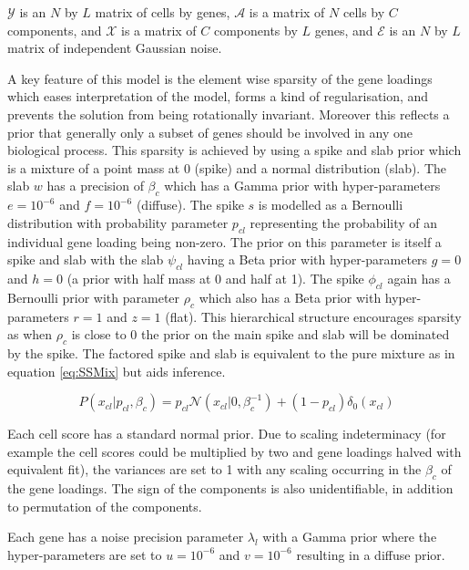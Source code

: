 $\mathcal{Y}$ is an $N$ by $L$ matrix of cells by genes, $\mathcal{A}$ is a matrix of $N$ cells by $C$ components, and $\mathcal{X}$ is a matrix of $C$ components by $L$ genes, and $\mathcal{E}$ is an $N$ by $L$ matrix of independent Gaussian noise.

A key feature of this model is the element wise sparsity of the gene loadings which eases interpretation of the model, forms a kind of regularisation, and prevents the solution from being rotationally invariant. Moreover this reflects a prior that generally only a subset of genes should be involved in any one biological process. This sparsity is achieved by using a spike and slab prior which is a mixture of a point mass at 0 (spike) and a normal distribution (slab). The slab $w$ has a precision of $\beta_{c}$ which has a Gamma prior with hyper-parameters $e = 10^{-6}$ and $f = 10^{-6}$ (diffuse). The spike $s$ is modelled as a Bernoulli distribution with probability parameter $p_{cl}$ representing the probability of an individual gene loading being non-zero. The prior on this parameter is itself a spike and slab with the slab $\psi_{c l}$ having a Beta prior with hyper-parameters $g=0$ and $h=0$ (a prior with half mass at 0 and half at 1). The spike $\phi_{c l}$ again has a Bernoulli prior with parameter $\rho_{c}$ which also has a Beta prior with hyper-parameters $r=1$ and $z=1$ (flat). This hierarchical structure encourages sparsity as when $\rho_{c}$ is close to 0 the prior on the main spike and slab will be dominated by the spike. The factored spike and slab is equivalent to the pure mixture as in equation \ref{eq:SSMix} but aids inference.

\begin{equation}
P\left(x_{c l} | p_{c l}, \beta_{c}\right)=p_{c l} \mathcal{N}\left(x_{c l} | 0, \beta_{c}^{-1}\right)+\left(1-p_{c l}\right) \delta_{0}\left(x_{c l}\right)
\label{eq:SSMix}
\end{equation}

Each cell score has a standard normal prior. Due to scaling indeterminacy (for example the cell scores could be multiplied by two and gene loadings halved with equivalent fit), the variances are set to 1 with any scaling occurring in the $\beta_{c}$ of the gene loadings. The sign of the components is also unidentifiable, in addition to permutation of the components.

Each gene has a noise precision parameter $\lambda_{l}$ with a Gamma prior where the hyper-parameters are set to $u = 10^{-6}$ and $v = 10^{-6}$ resulting in a diffuse prior. 


